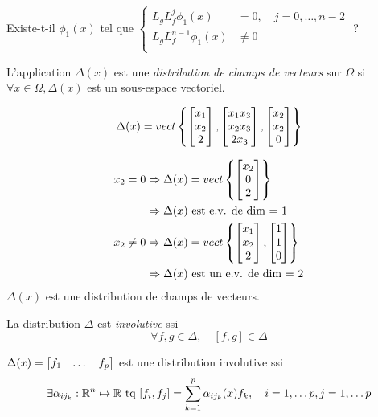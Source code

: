 \documentclass[main.tex]{subfiles}
\begin{document}
Existe-t-il $\phi_1(x)$ tel que
$\begin{cases}
  L_g L_f^j \phi_1(x) & = 0, \quad j = 0, \dots, n-2\\
  L_g L_f^{n-1}  \phi_1(x) & \neq 0 \\
\end{cases} $ ?

\begin{defin}
L'application $\Delta(x)$ est une\emph{ distribution de champs de vecteurs} sur $\Omega$ si $\forall x \in \Omega, \Delta(x)$ est un sous-espace vectoriel.
\end{defin}

\begin{exemple}
\[\Delta(x) = vect \left\lbrace \begin{bmatrix} x_1 \\ x_2 \\2 \end{bmatrix}, \begin{bmatrix} x_1x_3 \\ x_2x_3 \\ 2x_3 \end{bmatrix},\begin{bmatrix} x_2 \\ x_2 \\ 0 \end{bmatrix} \right\rbrace \]

\begin{align*}
x_2 = 0 & \Rightarrow \Delta(x) = vect \left\lbrace \begin{bmatrix} x_2 \\ 0 \\ 2 \end{bmatrix} \right\rbrace \\
& \Rightarrow \Delta(x) \text{ est e.v. de dim = 1} \\
x_2 \neq 0
& \Rightarrow \Delta(x) = vect \left\lbrace \begin{bmatrix} x_1 \\ x_2 \\ 2 \end{bmatrix},\begin{bmatrix} 1 \\ 1 \\ 0 \end{bmatrix} \right\rbrace \\
& \Rightarrow \Delta(x) \text{ est un e.v. de dim = 2}
\end{align*}
$\Delta(x)$ est une distribution de champs de vecteurs.
\end{exemple}

\begin{defin}
La distribution $\Delta$ est \emph{involutive} ssi 
\[\forall f,g \in \Delta, \quad [f,g] \in \Delta \]
\end{defin}

\begin{prop}
$\Delta(x) = \begin{bmatrix} f_1& \dots & f_p \end{bmatrix}$ est une distribution involutive ssi 
\[ \exists \alpha_{ij_k} : \mathbb{R}^n \mapsto \mathbb{R} \text{ tq } [f_i,f_j] = \sum_{k=1}^p \alpha_{ij_k}(x) f_k, \quad i = 1,\dots p, j = 1,\dots p\]
\end{prop}
\end{document}
